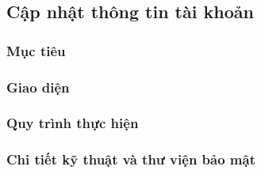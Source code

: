 \newpage
\subsection{Cập nhật thông tin tài khoản}
\subsubsection*{Mục tiêu}

\subsubsection*{Giao diện}

\subsubsection*{Quy trình thực hiện}

\subsubsection*{Chi tiết kỹ thuật và thư viện bảo mật}